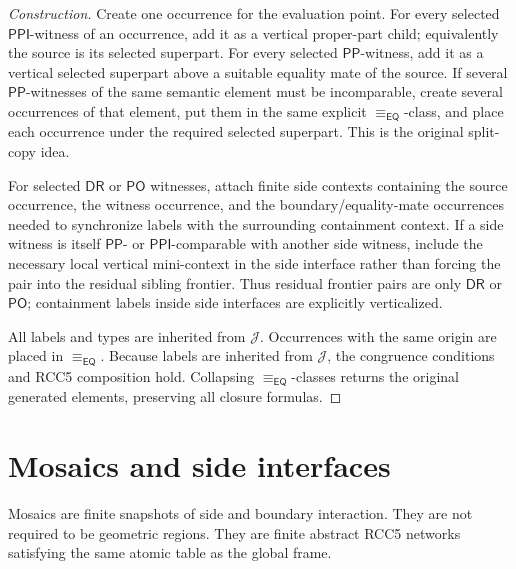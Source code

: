\documentclass[11pt]{article}
\newcommand{\EQ}{\mathsf{EQ}}
\newcommand{\PP}{\mathsf{PP}}
\newcommand{\PPI}{\mathsf{PPI}}
\newcommand{\PO}{\mathsf{PO}}
\newcommand{\DR}{\mathsf{DR}}
\newcommand{\J}{\mathcal J}
\newcommand{\eqc}{\equiv_{\EQ}}
\begin{document}
\begin{proof}[Construction]
Create one occurrence for the evaluation point.  For every selected \(\PPI\)-witness of an occurrence, add it as a vertical proper-part child; equivalently the source is its selected superpart.  For every selected \(\PP\)-witness, add it as a vertical selected superpart above a suitable equality mate of the source.  If several \(\PP\)-witnesses of the same semantic element must be incomparable, create several occurrences of that element, put them in the same explicit \(\eqc\)-class, and place each occurrence under the required selected superpart.  This is the original split-copy idea.

For selected \(\DR\) or \(\PO\) witnesses, attach finite side contexts containing the source occurrence, the witness occurrence, and the boundary/equality-mate occurrences needed to synchronize labels with the surrounding containment context.  If a side witness is itself \(\PP\)- or \(\PPI\)-comparable with another side witness, include the necessary local vertical mini-context in the side interface rather than forcing the pair into the residual sibling frontier.  Thus residual frontier pairs are only \(\DR\) or \(\PO\); containment labels inside side interfaces are explicitly verticalized.

All labels and types are inherited from \(\J\).  Occurrences with the same origin are placed in \(\eqc\).  Because labels are inherited from \(\J\), the congruence conditions and RCC5 composition hold.  Collapsing \(\eqc\)-classes returns the original generated elements, preserving all closure formulas.
\end{proof}

\section{Mosaics and side interfaces}

Mosaics are finite snapshots of side and boundary interaction.  They are not required to be geometric regions.  They are finite abstract RCC5 networks satisfying the same atomic table as the global frame.
\end{document}

